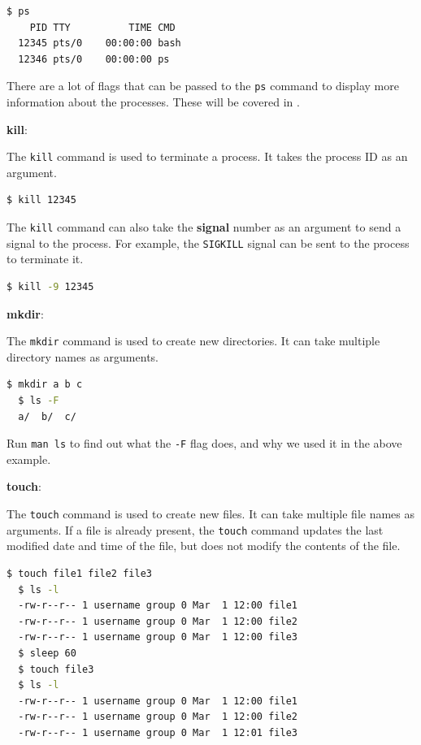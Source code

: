 \begin{lstlisting}[language=bash]
  $ ps
    PID TTY          TIME CMD
  12345 pts/0    00:00:00 bash
  12346 pts/0    00:00:00 ps
\end{lstlisting}

There are a lot of flags that can be passed to the \texttt{ps} command to display more information about the processes. These will be covered in .

\textbf{kill}:

The \texttt{kill} command is used to terminate a process.
It takes the process ID as an argument.

\begin{lstlisting}[language=bash]
  $ kill 12345
\end{lstlisting}

The \texttt{kill} command can also take the \textbf{signal} number as an argument to send a signal to the process.
For example, the \texttt{SIGKILL} signal can be sent to the process to terminate it.

\begin{lstlisting}[language=bash]
  $ kill -9 12345
\end{lstlisting}

\textbf{mkdir}:

The \texttt{mkdir} command is used to create new directories.
It can take multiple directory names as arguments.

\begin{lstlisting}[language=bash]
  $ mkdir a b c
  $ ls -F
  a/  b/  c/
\end{lstlisting}

\begin{exercise}
  Run \texttt{man ls} to find out what the \texttt{-F} flag does, and why we used it in the above example.
\end{exercise}

\textbf{touch}:

The \texttt{touch} command is used to create new files.
It can take multiple file names as arguments.
If a file is already present, the \texttt{touch} command updates the last modified date and time of the file, but does not modify the contents of the file.

\begin{lstlisting}[language=bash]
  $ touch file1 file2 file3
  $ ls -l
  -rw-r--r-- 1 username group 0 Mar  1 12:00 file1
  -rw-r--r-- 1 username group 0 Mar  1 12:00 file2
  -rw-r--r-- 1 username group 0 Mar  1 12:00 file3
  $ sleep 60
  $ touch file3
  $ ls -l
  -rw-r--r-- 1 username group 0 Mar  1 12:00 file1
  -rw-r--r-- 1 username group 0 Mar  1 12:00 file2
  -rw-r--r-- 1 username group 0 Mar  1 12:01 file3
\end{lstlisting}


